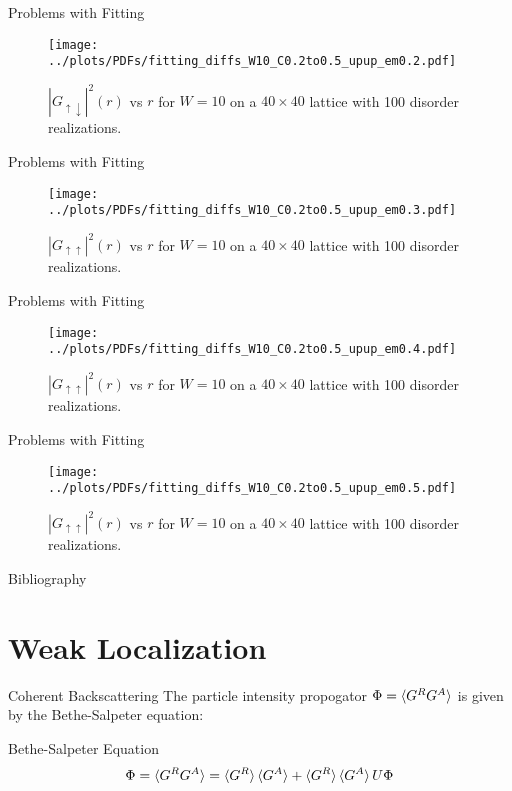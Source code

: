 \documentclass[]{beamer}
\begin{document}
\begin{frame}{Problems with Fitting}
    \begin{figure}
        \centering
        \texttt{[image: ../plots/PDFs/fitting\_diffs\_W10\_C0.2to0.5\_upup\_em0.2.pdf]}
        \caption{$|G_{\uparrow\downarrow}|^2(r)$ vs $r$ for $W = 10$ on a $40\times40$ lattice with 100 disorder realizations.}
    \end{figure}        
\end{frame}

\begin{frame}{Problems with Fitting}
    \begin{figure}
        \centering
        \texttt{[image: ../plots/PDFs/fitting\_diffs\_W10\_C0.2to0.5\_upup\_em0.3.pdf]}
        \caption{$|G_{\uparrow\uparrow}|^2(r)$ vs $r$ for $W = 10$ on a $40\times40$ lattice with 100 disorder realizations.}
    \end{figure}        
\end{frame}

\begin{frame}{Problems with Fitting}
    \begin{figure}
        \centering
        \texttt{[image: ../plots/PDFs/fitting\_diffs\_W10\_C0.2to0.5\_upup\_em0.4.pdf]}
        \caption{$|G_{\uparrow\uparrow}|^2(r)$ vs $r$ for $W = 10$ on a $40\times40$ lattice with 100 disorder realizations.}
    \end{figure}        
\end{frame}

\begin{frame}{Problems with Fitting}
    \begin{figure}
        \centering
        \texttt{[image: ../plots/PDFs/fitting\_diffs\_W10\_C0.2to0.5\_upup\_em0.5.pdf]}
        \caption{$|G_{\uparrow\uparrow}|^2(r)$ vs $r$ for $W = 10$ on a $40\times40$ lattice with 100 disorder realizations.}
    \end{figure}        
\end{frame}


\begin{frame}[allowframebreaks]{Bibliography}
    \tiny{\printbibliography}
\end{frame}

\appendix
\section{Weak Localization}
\begin{frame}{Coherent Backscattering}
    The particle intensity propogator $\Phi = \braket{G^R
    G^A}$ is given by the Bethe-Salpeter equation:
    \begin{block}{Bethe-Salpeter Equation}
        \[
            \Phi = \braket{G^R G^A} = \braket{G^R}\braket{G^A}
            + \braket{G^R}\braket{G^A}U\Phi
        \]
    \end{block}
\end{frame}
\end{document}
